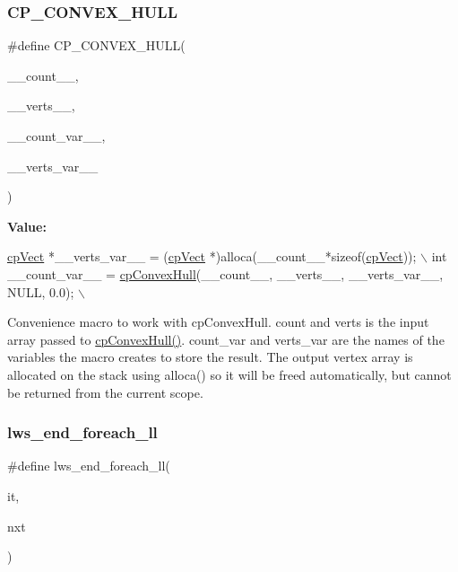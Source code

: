 \subsubsection{\texorpdfstring{C\+P\+\_\+\+C\+O\+N\+V\+E\+X\+\_\+\+H\+U\+LL}{CP\_CONVEX\_HULL}\hspace{0.1cm}{\footnotesize\ttfamily [2/2]}}
{\footnotesize\ttfamily \#define C\+P\+\_\+\+C\+O\+N\+V\+E\+X\+\_\+\+H\+U\+LL(\begin{DoxyParamCaption}\item[{}]{\+\_\+\+\_\+count\+\_\+\+\_\+,  }\item[{}]{\+\_\+\+\_\+verts\+\_\+\+\_\+,  }\item[{}]{\+\_\+\+\_\+count\+\_\+var\+\_\+\+\_\+,  }\item[{}]{\+\_\+\+\_\+verts\+\_\+var\+\_\+\+\_\+ }\end{DoxyParamCaption})}

{\bfseries Value\+:}
\begin{DoxyCode}
\hyperlink{structcpVect}{cpVect} *\_\_verts\_var\_\_ = (\hyperlink{structcpVect}{cpVect} *)alloca(\_\_count\_\_*\textcolor{keyword}{sizeof}(\hyperlink{structcpVect}{cpVect})); \(\backslash\)
int \_\_count\_var\_\_ = \hyperlink{group__misc_ga94ed1fc4d2c987c3e4df3cb16b12a156}{cpConvexHull}(\_\_count\_\_, \_\_verts\_\_, \_\_verts\_var\_\_, NULL, 0.0); \(\backslash\)
\end{DoxyCode}
Convenience macro to work with cp\+Convex\+Hull. {\ttfamily count} and {\ttfamily verts} is the input array passed to \hyperlink{group__misc_ga94ed1fc4d2c987c3e4df3cb16b12a156}{cp\+Convex\+Hull()}. {\ttfamily count\+\_\+var} and {\ttfamily verts\+\_\+var} are the names of the variables the macro creates to store the result. The output vertex array is allocated on the stack using alloca() so it will be freed automatically, but cannot be returned from the current scope. \mbox{\label{group__misc_ga9d94995ca7a1be16bf3d7bd2e449c812}} 
\subsubsection{\texorpdfstring{lws\+\_\+end\+\_\+foreach\+\_\+ll}{lws\_end\_foreach\_ll}\hspace{0.1cm}{\footnotesize\ttfamily [1/6]}}
{\footnotesize\ttfamily \#define lws\+\_\+end\+\_\+foreach\+\_\+ll(\begin{DoxyParamCaption}\item[{}]{it,  }\item[{}]{nxt }\end{DoxyParamCaption})}

